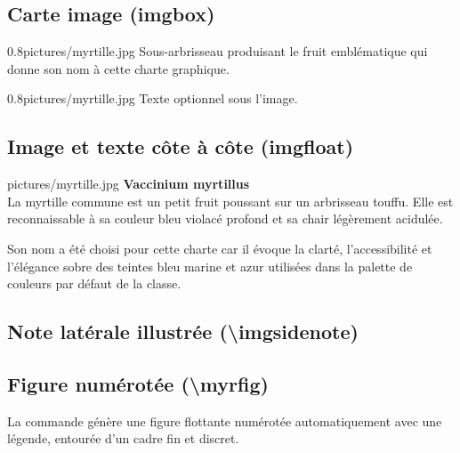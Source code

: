 \documentclass[theme=myrtille]{myrtille}
\begin{document}
\subsection{Carte image (imgbox)}
\begin{imgbox}[La myrtille]{0.8\linewidth}{pictures/myrtille.jpg}
    Sous-arbrisseau produisant le fruit emblématique qui donne son nom à cette charte graphique.
\end{imgbox}

\begin{texblock}
\begin{imgbox}{0.8\linewidth}{pictures/myrtille.jpg}
Texte optionnel sous l'image.
\end{imgbox}
\end{texblock}

\subsection{Image et texte côte à côte (imgfloat)}
\begin{imgfloat}{pictures/myrtille.jpg}
\textbf{Vaccinium myrtillus}\\[4pt]
La myrtille commune est un petit fruit poussant sur un arbrisseau touffu. Elle est reconnaissable à sa couleur bleu violacé profond et sa chair légèrement acidulée.

Son nom a été choisi pour cette charte car il évoque la clarté, l'accessibilité et l'élégance sobre des teintes bleu marine et azur utilisées dans la palette de couleurs par défaut de la classe.
\end{imgfloat}

\subsection{Note latérale illustrée (\textbackslash imgsidenote)}

\subsection{Figure numérotée (\textbackslash myrfig)}
La commande  génère une figure flottante numérotée automatiquement avec une légende, entourée d'un cadre fin et discret.

\end{document}
